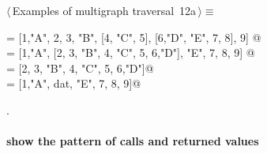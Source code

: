 \documentclass[11pt,oneside]{article}	%
\begin{document}
\begin{flushleft} \small \label{scrap27}
\protect{}$\langle\,$Examples of multigraph traversal\nobreak\ {\footnotesize 12a}$\,\rangle\equiv$
\vspace{-1ex}
\begin{list}{}{} \item
\mbox{}\verb@data = [1,"A", 2, 3, "B", [4, "C", 5], [6,"D", "E", 7, 8], 9]  @\\
\mbox{}\verb@data = [1,"A", [2, 3, "B", 4, "C", 5, 6,"D"], "E", 7, 8, 9]  @\\
\mbox{}\verb@data = [2, 3, "B", 4, "C", 5, 6,"D"]@\\
\mbox{}\verb@data = [1,"A", dat, "E", 7, 8, 9]@\\
\mbox{}\verb@@{\NWsep}
\end{list}
\vspace{-1ex}
\footnotesize\addtolength{\baselineskip}{-1ex}
\begin{list}{}{\setlength{\itemsep}{-\parsep}\setlength{\itemindent}{-\leftmargin}}
\item {\NWtxtMacroNoRef}.
\end{list}
\end{flushleft}


\paragraph{show the pattern of calls and returned values}
\end{document}
